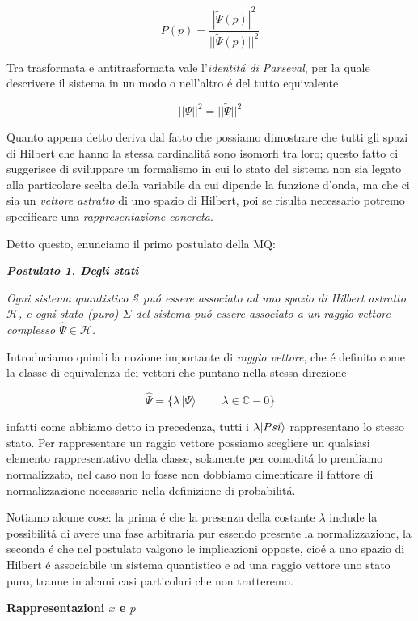 $$P(p)=\frac{|\tilde{\Psi}(p)|^{2}}{||\tilde{\Psi}(p)||^{2}}$$

Tra trasformata e antitrasformata vale l'\textit{identit\'a di Parseval}, per la quale descrivere il sistema in un modo o nell'altro \'e del tutto equivalente 

$$||\Psi||^2 = ||\tilde{\Psi}||^2$$

Quanto appena detto deriva dal fatto che possiamo dimostrare che tutti gli spazi di Hilbert che hanno la stessa cardinalit\'a sono isomorfi tra loro; questo fatto ci suggerisce di sviluppare un formalismo in cui lo stato del sistema non sia legato alla particolare scelta della variabile da cui dipende la funzione d'onda, ma che ci sia un \textit{vettore astratto} di uno spazio di Hilbert, poi se risulta necessario potremo specificare una \textit{rappresentazione concreta}.

Detto questo, enunciamo il primo postulato della MQ:

\textbf{\textit{Postulato 1. Degli stati}} 

\textit{Ogni sistema quantistico $\mathcal{S}$ pu\'o essere associato ad uno spazio di Hilbert astratto $\mathcal{H}$, e ogni stato (puro) $\Sigma$ del sistema pu\'o essere associato a un raggio vettore complesso $\hat{\Psi} \in \mathcal{H}$.}

Introduciamo quindi la nozione importante di \textit{raggio vettore}, che \'e definito come la classe di equivalenza dei vettori che puntano nella stessa direzione

$${\hat{\Psi}}=\{\lambda\,|\Psi\rangle\quad\big|\quad\lambda\in\mathbb{C}-0\}$$

infatti come abbiamo detto in precedenza, tutti i $\lambda \ket{Psi}$ rappresentano lo stesso stato. Per rappresentare un raggio vettore possiamo scegliere un qualsiasi elemento rappresentativo della classe, solamente per comodit\'a lo prendiamo normalizzato, nel caso non lo fosse non dobbiamo dimenticare il fattore di normalizzazione necessario nella definizione di probabilit\'a.

Notiamo alcune cose: la prima \'e che la presenza della costante $\lambda$ include la possibilit\'a di avere una fase arbitraria pur essendo presente la normalizzazione, la seconda \'e che nel postulato valgono le implicazioni opposte, cio\'e a uno spazio di Hilbert \'e associabile un sistema quantistico e ad una raggio vettore uno stato puro, tranne in alcuni casi particolari che non tratteremo.


\textbf{Rappresentazioni $x$ e $p$}


